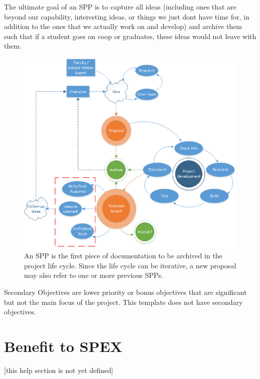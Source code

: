 \documentclass[journal]{SPEXformat}
\newenvironment{help}{
  \ttfamily\footnotesize\sloppy
  \begin{lrbox}{\helpbox}\begin{minipage}{\linewidth}
  }{
  \end{minipage}\end{lrbox}
  \ifbool{showhelp}{
    \fbox{\usebox{\helpbox}}
  }{}
}
\begin{document}
The ultimate goal of an SPP is to capture all ideas (including ones that are beyond our capability, interesting ideas, or things we just dont have time for, in addition to the ones that we actually work on and develop) and archive them such that if a student goes on coop or graduates, these ideas would not leave with them.

\begin{figure}
  \includegraphics[width=\linewidth]{figs/project-life-cycle.png}
  \caption{An SPP is the first piece of documentation to be archived in the project life cycle. Since the life cycle can be iterative, a new proposal may also refer to one or more previous SPPs.}
\label{fig:lifecycle}
\end{figure}


\begin{help}
  Secondary Objectives are lower priority or bonus objectives that are significant but not the main focus of the project. This template does not have secondary objectives.
\end{help}

\section{Benefit to SPEX}
\label{sec:benefit}
\begin{help}
  [this help section is not yet defined]
\end{help}
\end{document}
